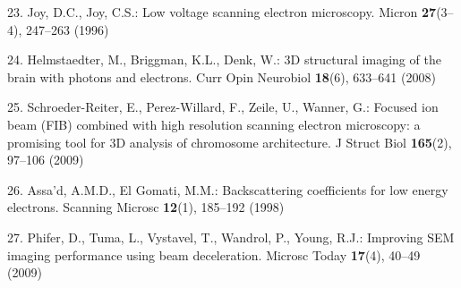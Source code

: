 \documentclass{article}
\begin{document}
\begin{hangpars}
23. Joy, D.C., Joy, C.S.: Low voltage scanning electron microscopy. Micron \textbf{27}(3–4), 247–263 (1996)

24. Helmstaedter, M., Briggman, K.L., Denk, W.: 3D structural imaging of the brain with photons and electrons. Curr Opin Neurobiol \textbf{18}(6), 633–641 (2008)

25. Schroeder-Reiter, E., Perez-Willard, F., Zeile, U., Wanner, G.: Focused ion beam (FIB) combined with high resolution scanning electron microscopy: a promising tool for 3D analysis of chromosome architecture. J Struct Biol \textbf{165}(2), 97–106 (2009)

26. Assa’d, A.M.D., El Gomati, M.M.: Backscattering coefficients for low energy electrons. Scanning Microsc \textbf{12}(1), 185–192 (1998)

27. Phifer, D., Tuma, L., Vystavel, T., Wandrol, P., Young, R.J.: Improving SEM imaging performance using beam deceleration. Microsc Today \textbf{17}(4), 40–49 (2009)
\end{hangpars}
\end{document}
